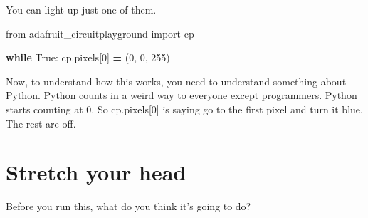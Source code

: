 \documentclass[
]{book}
\newenvironment{Shaded}{\begin{snugshade}}{\end{snugshade}}
\newcommand{\ControlFlowTok}[1]{\textcolor[rgb]{0.13,0.29,0.53}{\textbf{#1}}}
\newcommand{\DecValTok}[1]{\textcolor[rgb]{0.00,0.00,0.81}{#1}}
\newcommand{\ImportTok}[1]{#1}
\newcommand{\NormalTok}[1]{#1}
\newcommand{\OperatorTok}[1]{\textcolor[rgb]{0.81,0.36,0.00}{\textbf{#1}}}
\newcommand{\VariableTok}[1]{\textcolor[rgb]{0.00,0.00,0.00}{#1}}
\begin{document}
You can light up just one of them.

\begin{Shaded}
\begin{Highlighting}[]
\ImportTok{from}\NormalTok{ adafruit_circuitplayground }\ImportTok{import}\NormalTok{ cp}
 
\ControlFlowTok{while} \VariableTok{True}\NormalTok{:}
\NormalTok{    cp.pixels[}\DecValTok{0}\NormalTok{] }\OperatorTok{=}\NormalTok{ (}\DecValTok{0}\NormalTok{, }\DecValTok{0}\NormalTok{, }\DecValTok{255}\NormalTok{) }
\end{Highlighting}
\end{Shaded}

Now, to understand how this works, you need to understand something about Python. Python counts in a weird way to everyone except programmers. Python starts counting at 0. So cp.pixels{[}0{]} is saying go to the first pixel and turn it blue. The rest are off.

\hypertarget{stretch-your-head}{%
\section{Stretch your head}\label{stretch-your-head}}

Before you run this, what do you think it's going to do?
\end{document}
